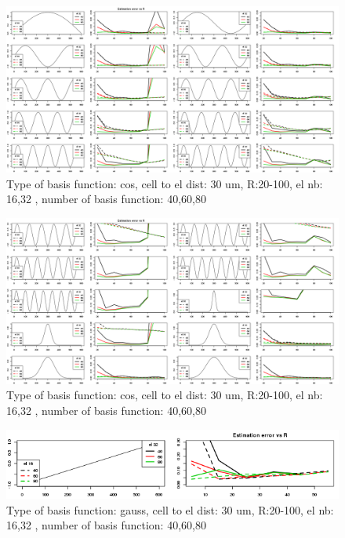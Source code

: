 \documentclass[12pt,a4paper]{article}
\begin{document}
\begin{figure}[h]
\includegraphics[width=15cm]{plots/error_Rtest_cos_patt3_12_el_both.png}
\caption{Type of basis function: cos, cell to el dist: 30 um, R:20-100, el nb: 16,32 , number of basis function: 40,60,80}
\label{fig:error_cos}
\end{figure}

\begin{figure}[h]
\includegraphics[width=15cm]{plots/error_Rtest_cos_patt13_22_el_both.png}
\caption{Type of basis function: cos, cell to el dist: 30 um, R:20-100, el nb: 16,32 , number of basis function: 40,60,80}
\label{fig:error_cos2}
\end{figure}


\begin{figure}[h]
\includegraphics[width=15cm]{plots/error_Rtest_gauss2_patt1_el_both.png}
\caption{Type of basis function: gauss, cell to el dist: 30 um, R:20-100, el nb: 16,32 , number of basis function: 40,60,80}
\label{fig:error_gauss0}
\end{figure}
\end{document}
